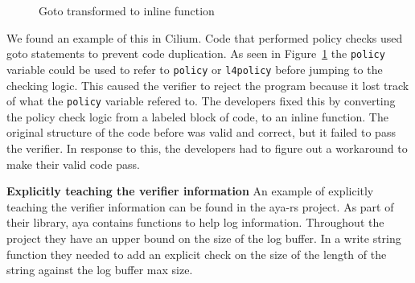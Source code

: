 \begin{figure}
    
    \caption{Goto transformed to inline function}
    \label{fig:inline-fig}
\end{figure}

%
%

We found an example of this in Cilium.
Code that performed policy checks used goto statements to prevent code duplication.
As seen in Figure~\ref{fig:inline-fig} the \texttt{policy} variable could be used to refer to \texttt{policy} or \texttt{l4policy} before jumping to the checking logic.
This caused the verifier to reject the program because it lost track of what the \texttt{policy} variable refered to.
The developers fixed this by converting the policy check logic from a labeled block of code, to an inline function.
The original structure of the code before was valid and correct, but it failed to pass the verifier.
In response to this, the developers had to figure out a workaround to make their valid code pass.


\noindent\textbf{Explicitly teaching the verifier information}
An example of explicitly teaching the verifier information can be found in the aya-rs project.
As part of their library, aya contains functions to help log information.
Throughout the project they have an upper bound on the size of the log buffer.
In a write string function they needed to add an explicit check on the size of the length of the string against the log buffer max size.


